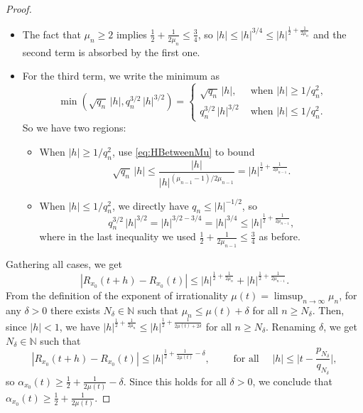 \documentclass[11pt,reqno]{amsart}
\theoremstyle{definition}
\begin{document}
\begin{proof}
\begin{itemize}
	\item The fact that $\mu_n \geq 2$ implies $\frac12 + \frac{1}{2\mu_n} \leq \frac34$, so 
	$ |h| \leq |h|^{3/4} \leq  |h|^{\frac12 + \frac{1}{2\mu_n}}$ 
	and the second term is absorbed by the first one. 
	
	\item For the third term, we write the minimum as
	\begin{equation}
	\min (\sqrt{q_n} \, |h|, q_n^{3/2} \, |h|^{3/2}) = \left\{ \begin{array}{ll}
	\sqrt{q_n} \, |h|, & \text{ when } |h| \geq 1/q_n^2, \\
	q_n^{3/2} \, |h|^{3/2}& \text{ when } |h| \leq 1/q_n^2.
	\end{array}
	\right.
	\end{equation}
	So we have two regions: 
	\begin{itemize}
		\item When $|h| \geq 1/q_n^2$, use \eqref{eq:HBetweenMu} to bound  
		\begin{equation}
		\sqrt{q_n} \, |h| \leq \frac{|h|}{|h|^{(\mu_{n-1} - 1)/2\mu_{n-1}}} = |h|^{\frac12 +  \frac{1}{2\mu_{n-1}}}.
		\end{equation}
		
		\item When $|h| \leq 1/q_n^2$, we directly have $q_n \leq |h|^{-1/2}$, so 
		\begin{equation}
		q_n^{3/2} \, |h|^{3/2} = |h|^{3/2 - 3/4} = |h|^{3/4} \leq |h|^{\frac12 +  \frac{1}{2\mu_{n-1}}},
		\end{equation}
		where in the last inequality we used $\frac12 + \frac{1}{2\mu_{n-1}} \leq \frac34$ as before. 
\end{itemize}		
\end{itemize}
Gathering all cases,  we get 
\begin{equation}
| R_{x_0}(t + h) -  R_{x_0}(t) | \leq |h|^{\frac12 + \frac{1}{2\mu_n}} +  |h|^{ \frac12 + \frac{1}{2\mu_{n-1}} }.
\end{equation} 
From the definition of the exponent of irrationality
 $\mu(t) = \limsup_{n \to \infty} \mu_n$, for any $\delta > 0$  
 there exists $N_\delta \in \mathbb N$  such that $\mu_n \leq \mu(t) + \delta$ for all $n \geq N_\delta$. 
Then, since $|h| < 1$, we have $|h|^{\frac12 + \frac{1}{2\mu_n}} \leq |h|^{\frac12 + \frac{1}{2\mu(t) + 2\delta}} $ for all $n \geq N_\delta$. 
Renaming $\delta$, we get $N_\delta \in \mathbb N$ such that 
\begin{equation}
| R_{x_0}(t + h) -  R_{x_0}(t) | \leq |h|^{\frac12 + \frac{1}{2\mu(t)} - \delta}, \qquad \text{ for  all } \quad  |h| \leq \Big| t - \frac{p_{N_\delta}}{q_{N_\delta}} \Big|, 
\end{equation}
so $\alpha_{x_0}(t) \geq \frac12 + \frac{1}{2\mu(t)} - \delta$. Since this holds for all $\delta > 0$, we conclude that $\alpha_{x_0}(t) \geq \frac12 + \frac{1}{2\mu(t)}$. 
\end{proof}
\end{document}

